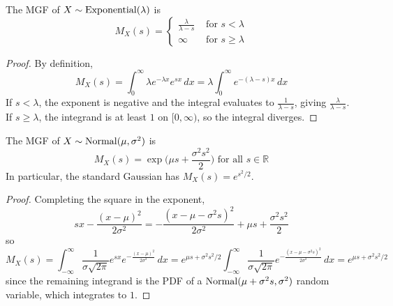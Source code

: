 	\begin{theorem}
	  \label{thm:mgf-of-exponential-distribution}
		The MGF of \hyperref[def:exponential-random-variable]{$X \sim \operatorname{Exponential}(\lambda)$} is 
		\begin{equation}
			M_X (s) = \begin{cases} 
			\frac{\lambda}{\lambda - s} & \text{ for } s < \lambda \\
			\infty & \text{ for } s \geq \lambda 
			\end{cases}
		\end{equation}
	\end{theorem}
	\begin{proof}
		By definition, 
		\begin{equation}
			M_X (s) = \int_0^\infty \lambda e^{-\lambda x} e^{s x} \, dx = \lambda \int_0^\infty e^{-(\lambda - s) x} \, dx
		\end{equation}
		If $s < \lambda$, the exponent is negative and the integral evaluates to $\frac{1}{\lambda - s}$, giving $\frac{\lambda}{\lambda - s}$. If $s \geq \lambda$, the integrand is at least $1$ on $[0, \infty)$, so the integral diverges. 
	\end{proof}

	\begin{theorem}
	  \label{thm:mgf-of-gaussian-distribution}
		The MGF of \hyperref[def:gaussian-random-variable]{$X \sim \operatorname{Normal}(\mu, \sigma^2)$} is 
		\begin{equation}
			M_X (s) = \exp \bigg( \mu s + \frac{\sigma^2 s^2}{2} \bigg) \text{ for all } s \in \mathbb{R}
		\end{equation}
		In particular, the standard Gaussian has $M_X (s) = e^{s^2 / 2}$. 
	\end{theorem}
	\begin{proof}
		Completing the square in the exponent, 
		\begin{equation}
			s x - \frac{(x - \mu)^2}{2 \sigma^2} = - \frac{(x - \mu - \sigma^2 s)^2}{2 \sigma^2} + \mu s + \frac{\sigma^2 s^2}{2}
		\end{equation}
		so 
		\begin{equation}
			M_X (s) = \int_{-\infty}^\infty \frac{1}{\sigma \sqrt{2 \pi}} e^{s x} e^{-\frac{(x - \mu)^2}{2 \sigma^2}} \,dx = e^{\mu s + \sigma^2 s^2 / 2} \int_{-\infty}^\infty \frac{1}{\sigma \sqrt{2\pi}} e^{-\frac{(x - \mu - \sigma^2 s)^2}{2 \sigma^2}}\,dx = e^{\mu s + \sigma^2 s^2 / 2}
		\end{equation}
		since the remaining integrand is the PDF of a $\operatorname{Normal}(\mu + \sigma^2 s, \sigma^2)$ random variable, which integrates to $1$. 
	\end{proof}

